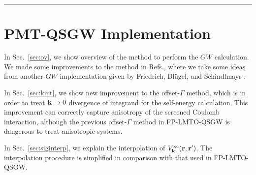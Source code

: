 \documentclass[twocolumn,showpacs,preprintnumbers,amsmath,amssymb,floatfix]{revtex4-1}
\newcommand{\bfk}{{\bf k}}
\newcommand{\bfr}{{\bf r}}
\def\vxc{V^{\rm xc}}
\begin{document}
\newpage
\begin{widetext}
 \hrule width 18cm
\end{widetext}

\section{PMT-QSGW Implementation}
\label{sec:impl}

In Sec.~\ref{sec:ov}, we show overview of the method to perform
the $GW$ calculation. We made some improvements to the method in
Refs.,
where we take some ideas from another $GW$ implementation 
given by Friedrich, Bl\"ugel, and Schindlmayr
\cite{friedrich_efficient_2010}.

In Sec.~\ref{sec:kint}, we show new improvement to the offset-$\Gamma$ method, which is
in order to treat $\bfk \to 0$ divergence of integrand for the self-energy calculation.
This improvement can correctly capture anisotropy of the screened Coulomb interaction,
although the previous offset-$\Gamma$ method in FP-LMTO-QSGW \cite{kotani_quasiparticle_2007}
is dangerous to treat anisotropic systems.

In Sec.~\ref{sec:siginterp}, we explain the interpolation of 
$\vxc_\bfk(\bfr,\bfr')$. The interpolation procedure
is simplified in comparison with that used in FP-LMTO-QSGW.
\end{document}
